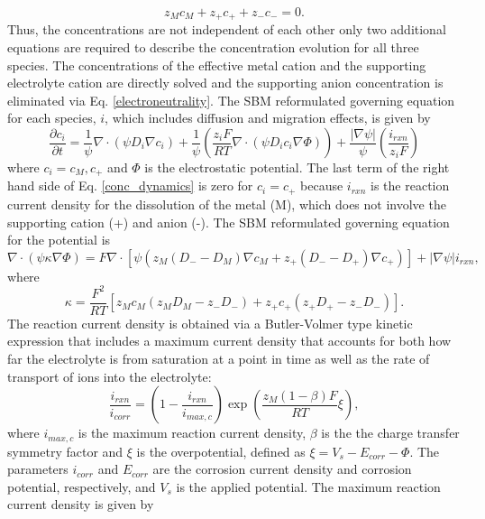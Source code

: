 \documentclass[11pt]{article}
\renewcommand{\=}[1]{\stackrel{#1}{=}} %
\theoremstyle{definition}
\theoremstyle{remark}
\begin{document}
\begin{equation}
\label{electroneutrality}
z_M c_M + z_+ c_+ + z_-c_- = 0.
 \end{equation}
Thus, the concentrations are not independent of each other only two additional equations are required to describe the concentration evolution for all three species.  The concentrations of the effective metal cation and the supporting electrolyte cation are directly solved and the supporting anion concentration is eliminated via Eq. \eqref{electroneutrality}. The SBM reformulated governing equation for each species, $i$, which includes diffusion and migration effects, is given by
\begin{equation}
\label{conc_dynamics}
\frac{\partial c_i}{\partial t}=\frac{1}{\psi} \nabla \cdot (\psi D_i \nabla c_i) + \frac{1}{\psi} \left( \frac{z_i F}{RT} \nabla \cdot (\psi D_i c_i \nabla \Phi) \right)
+ \frac{|\nabla \psi|}{\psi} \left( \frac{i_{rxn}}{z_i F} \right)
\end{equation}
\noindent where $c_i =c_M, c_+$ and $\Phi$ is the electrostatic potential.  The last term of the right hand side of Eq. \eqref{conc_dynamics} is zero for $c_i =c_+$  because $i_{rxn}$ is the reaction current density for the dissolution of the metal (M), which does not involve the supporting cation (+) and anion (-). The SBM reformulated governing equation for the potential is
\begin{equation}
\nabla \cdot (\psi \kappa \nabla \Phi) = F \nabla \cdot \left[ \psi \left( z_M (D_- - D_M) \nabla c_M + z_+ (D_- - D_+)  \nabla c_+ \right) \right] + |\nabla \psi | i_{rxn},
\end{equation}
where 
\begin{equation}
\kappa =\frac{F^2}{RT}\left[ z_Mc_M\left( z_MD_M-z_-D_-\right) + z_+c_+\left( z_+D_+-z_-D_-\right) \right].
\end{equation}
The reaction current density is obtained via a Butler-Volmer type kinetic expression that includes a maximum current density that accounts for both how far the electrolyte is from saturation at a point in time as well as the rate of transport of ions into the electrolyte:
\begin{equation}
\frac{i_{rxn}}{i_{corr}}= \left( 1 - \frac{i_{rxn}}{i_{max,c}} \right) \exp \left( \frac{z_M (1-\beta) F}{RT}\xi \right),
\end{equation}
where $i_{max,c}$ is the maximum reaction current density, $\beta$ is the the charge transfer symmetry factor and $\xi$ is the overpotential, defined as $\xi=V_s-E_{corr}-\Phi$. The parameters $i_{corr}$ and $E_{corr}$ are the corrosion current density and corrosion potential, respectively, and $V_s$ is the applied potential. The maximum reaction current density is given by
\end{document}
